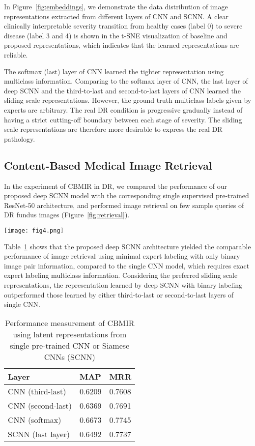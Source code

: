 \documentclass{article}
\begin{document}
In Figure~\ref{fig:embeddings}, we demonstrate the data distribution of image representations extracted from different layers of CNN and SCNN.
A clear clinically interpretable severity transition from healthy cases (label 0) to severe disease (label 3 and 4) is shown in the t-SNE visualization of baseline and proposed representations, which indicates that the learned representations are reliable.

The softmax (last) layer of CNN learned the tighter representation using multiclass information.
Comparing to the softmax layer of CNN, the last layer of deep SCNN and the third-to-last and second-to-last layers of CNN learned the sliding scale representations.
However, the ground truth multiclass labels given by experts are arbitrary. 
The real DR condition is progressive gradually instead of having a strict cutting-off boundary between each stage of severity. 
The sliding scale representations are therefore more desirable to express the real DR pathology.

\subsection{Content-Based Medical Image Retrieval}
In the experiment of CBMIR in DR, we compared the performance of our proposed deep SCNN model with the corresponding single supervised pre-trained ResNet-50 architecture, and performed image retrieval on few sample queries of DR fundus images (Figure~\ref{fig:retrieval}). 

\begin{figure*}[ht]
  \centering
  \texttt{[image: fig4.png]}
  \caption{Three samples of image retrieval after correct image preprocessing.}
  \label{fig:retrieval}
\end{figure*}

Table~\ref{table1} shows that the proposed deep SCNN architecture yielded the comparable performance of image retrieval using minimal expert labeling with only binary image pair information, compared to the single CNN model, which requires exact expert labeling multiclass information.
Considering the preferred sliding scale representations, the representation learned by deep SCNN with binary labeling outperformed those learned by either third-to-last or second-to-last layers of single CNN. 

\begin{table}[ht]
  \caption{Performance measurement of CBMIR using latent representations from single pre-trained CNN or Siamese CNNs (SCNN)}
  \label{table1}
  \centering
  \begin{tabular}{lll}
    \hline
    Layer & MAP & MRR \\
    \hline
    CNN (third-last) & 0.6209 & 0.7608 \\
    CNN (second-last) & 0.6369 & 0.7691 \\
    CNN (softmax) & 0.6673 & 0.7745 \\
    SCNN (last layer) & 0.6492 & 0.7737 \\
    \hline
  \end{tabular}
\end{table}
\end{document}
